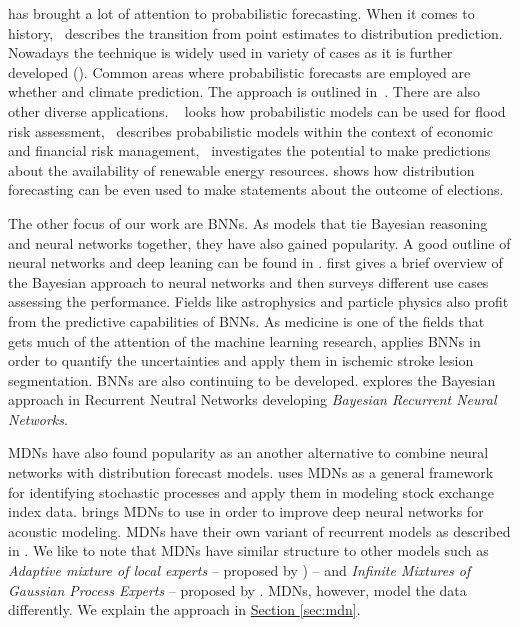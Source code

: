\documentclass[12pt,a4paper,twoside]{scrartcl}
\numberwithin{equation}{section}
\newcommand{\refsec}[1]{\hyperref[#1]{Section \ref*{#1}}}
\begin{document}
\cite{gneiting2014} has brought a lot of attention to probabilistic forecasting. When it comes to history,~\cite{stigler1975} describes the transition from point estimates to distribution prediction. Nowadays the technique is widely used in variety of cases as it is further developed (\cite{ehm2012}). Common areas where probabilistic forecasts are employed are whether and climate prediction. The approach is outlined in~\cite{collins2007}. There are also other diverse applications. ~\cite{krzysztofowic2001} looks how probabilistic models can be used for flood risk assessment,~\cite{timmermann2001} describes probabilistic models within the context of economic and financial risk management,~\cite{pinson2013} investigates the potential to make predictions about the availability of renewable energy resources. \cite{montgomery2012} shows how distribution forecasting can be even used to make statements about the outcome of elections.

The other focus of our work are BNNs. As models that tie Bayesian reasoning and neural networks together, they have also gained popularity. A good outline of neural networks and deep leaning can be found in \cite{schmidhuber2015}. \cite{vehtari2001} first gives a brief overview of the Bayesian approach to neural networks and then surveys different use cases assessing the performance. Fields like astrophysics \cite{bai2016} and particle physics \cite{bhat2015} also profit from the predictive capabilities of BNNs. As medicine is one of the fields that gets much of the attention of the machine learning research, \cite{kwon2017} applies BNNs in order to quantify the uncertainties and apply them in ischemic stroke lesion segmentation. BNNs are also continuing to be developed. \cite{fortunato2017} explores the Bayesian approach in Recurrent Neutral Networks developing \emph{Bayesian Recurrent Neural Networks}.

MDNs have also found popularity as an another alternative to combine neural networks with distribution forecast models. \cite{schittenkopf1998} uses MDNs as a general framework for identifying stochastic processes and apply them in modeling stock exchange index data. \cite{zen2014} brings MDNs to use in order to improve deep neural networks for acoustic modeling. MDNs have their own variant of recurrent models as described in \cite{miazhynskaia2003}. We like to note that MDNs have similar structure to other models such as \emph{Adaptive mixture of local experts} -- proposed by \cite{jacobs1991}) -- and \emph{Infinite Mixtures of Gaussian Process Experts} -- proposed by \cite{rasmussen2002}. MDNs, however, model the data differently. We explain the approach in \refsec{sec:mdn}.
\end{document}
